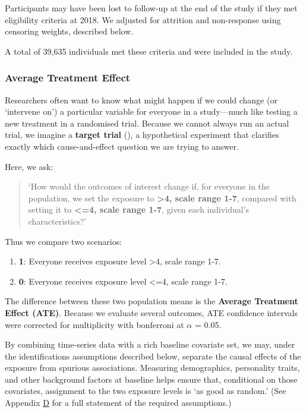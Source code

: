 \documentclass[
  single column]{article}
\providecommand{\tightlist}{%
  \setlength{\itemsep}{0pt}\setlength{\parskip}{0pt}}
\begin{document}
Participants may have been lost to follow-up at the end of the study if
they met eligibility criteria at 2018. We adjusted for attrition and
non-response using censoring weights, described below.

A total of 39,635 individuals met these criteria and were included in
the study.

\subsubsection{Average Treatment Effect}\label{average-treatment-effect}

Researchers often want to know what might happen if we could change (or
`intervene on') a particular variable for everyone in a study---much
like testing a new treatment in a randomised trial. Because we cannot
always run an actual trial, we imagine a \textbf{target trial}
(), a hypothetical
experiment that clarifies exactly which cause-and-effect question we are
trying to answer.

Here, we ask:

\begin{quote}
`How would the outcomes of interest change if, for everyone in the
population, we set the exposure to \textbf{\textgreater4, scale range
1-7}, compared with setting it to \textbf{\textless=4, scale range 1-7},
given each individual's characteristics?'
\end{quote}

Thus we compare two scenarios:

\begin{enumerate}
\def\labelenumi{\arabic{enumi}.}
\tightlist
\item
  \textbf{1}: Everyone receives exposure level \textgreater4, scale
  range 1-7.
\item
  \textbf{0}: Everyone receives exposure level \textless=4, scale range
  1-7.
\end{enumerate}

The difference between these two population means is the \textbf{Average
Treatment Effect (ATE)}. Because we evaluate several outcomes, ATE
confidence intervals were corrected for multiplicity with bonferroni at
\(\alpha\) = 0.05.

By combining time-series data with a rich baseline covariate set, we
may, under the identifications assumptions described below, separate the
causal effects of the exposure from spurious associations. Measuring
demographics, personality traits, and other background factors at
baseline helps ensure that, conditional on those covariates, assignment
to the two exposure levels is `as good as random.' (See Appendix
\hyperref[appendix-assumptions_grf]{D} for a full statement of the
required assumptions.)
\end{document}
